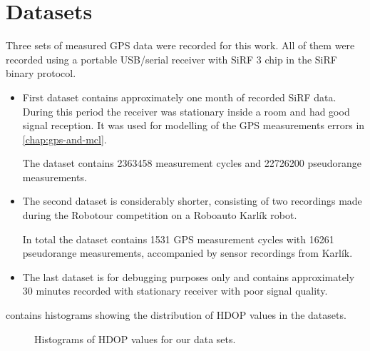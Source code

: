 \chapter{Datasets}
\label{chap:datasets}

Three sets of measured GPS data were recorded for this work.
All of them were recorded using a portable USB/serial receiver with SiRF 3 chip
in the SiRF binary protocol.

\begin{itemize}

\item
First dataset contains approximately one month of recorded SiRF data.
During this period the receiver was stationary inside a room and had good signal 
reception. 
It was used for modelling of the GPS measurements errors in \cref{chap:gps-and-mcl}.

The dataset contains \num{2363458} measurement cycles and
\num{22726200} pseudorange measurements.

\item
The second dataset is considerably shorter, consisting of two recordings made during
the Robotour competition \cite{robotour} on a Roboauto Karlík \cite{karlik} robot.

In total the dataset contains \num{1531} GPS measurement cycles with
\num{16261} pseudorange measurements, accompanied by sensor recordings from Karlík.

\item
The last dataset is for debugging purposes only and contains approximately
30 minutes recorded with stationary receiver with poor signal quality.

\end{itemize}

 contains histograms showing the distribution of HDOP values in the datasets.

\begin{figure}[htp]
	\centering
	\noindent{}
	\caption{Histograms of HDOP values for our data sets.}
	\label{fig:hdop-hist}
\end{figure}


